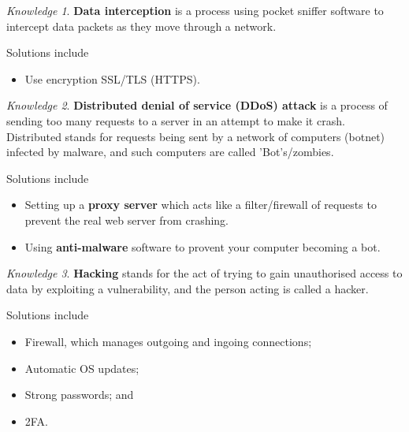 \documentclass[8pt]{article}
\theoremstyle{remark}
\newtheorem{knowledge}{Knowledge}[subsection]
\begin{document}
            \begin{knowledge}
                \textbf{Data interception} is a process using pocket sniffer software to intercept data packets as they move through a network.

                Solutions include
                \begin{itemize}
                    \item Use encryption SSL/TLS (HTTPS).
                \end{itemize}
            \end{knowledge}

            \begin{knowledge}
                \textbf{Distributed denial of service (DDoS) attack} is a process of sending too many requests to a server in an attempt to make it crash. Distributed stands for requests being sent by a network of computers (botnet) infected by malware, and such computers are called 'Bot's/zombies.

                Solutions include
                \begin{itemize}
                    \item Setting up a \textbf{proxy server} which acts like a filter/firewall of requests to prevent the real web server from crashing.
                    \item Using \textbf{anti-malware} software to provent your computer becoming a bot.
                \end{itemize}
            \end{knowledge}

            \begin{knowledge}
                \textbf{Hacking} stands for the act of trying to gain unauthorised access to data by exploiting a vulnerability, and the person acting is called a hacker.

                Solutions include
                \begin{itemize}
                    \item Firewall, which manages outgoing and ingoing connections;
                    \item Automatic OS updates;
                    \item Strong passwords; and
                    \item 2FA.
                \end{itemize}
            \end{knowledge}
\end{document}
